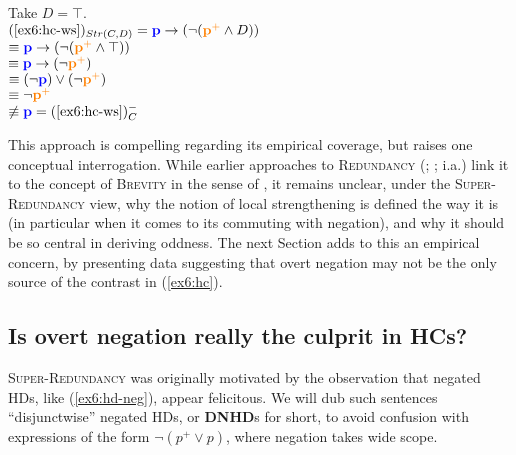 \begin{exe}
{		Take $D=\top$.\\
		$(\textref{ex6:hc-ws})_{Str(C, D)} =  \p \rightarrow (\neg(\pplus \wedge D)) $\\
		 $\equiv \textbf{\textcolor{blue}{p}} \rightarrow (\neg(\textbf{\textcolor{orange}{p$^+$}} \wedge \top))$\\
		 $\equiv \textbf{\textcolor{blue}{p}} \rightarrow (\neg\textbf{\textcolor{orange}{p$^+$}})$\\
		 $\equiv (\neg\textbf{\textcolor{blue}{p}}) \vee (\neg\textbf{\textcolor{orange}{p$^+$}})$\\
		 $\equiv \neg\textbf{\textcolor{orange}{p$^+$}}$\\
		 $\not\equiv \p = (\textref{ex6:hc-ws})^-_C$\\
		
	}
\end{exe}


This approach is compelling regarding its empirical coverage, but raises one conceptual interrogation. While earlier approaches to \textsc{Redundancy} (; ;  i.a.) link it to the concept of \textsc{Brevity} in the sense of \textcite{Grice1975}, it remains unclear, under the \textsc{Super-Redundancy} view, why the notion of local strengthening is defined the way it is (in particular when it comes to its commuting with negation), and why it should be so central in deriving oddness. The next Section adds to this an empirical concern, by presenting data suggesting that overt negation may not be the only source of the contrast in (\ref{ex6:hc}).



\subsection{Is overt negation really the culprit in HCs?}

\textsc{Super-Redundancy} was originally motivated by the observation that negated HDs, like (\ref{ex6:hd-neg}), appear felicitous. We will dub such sentences ``disjunctwise'' negated HDs, or \textbf{DNHD}s for short, to avoid confusion with expressions of the form $\neg (p^+ \vee p)$, where negation takes wide scope. 

\begin{exe}
	\label{ex6:hd-neg}
\end{exe}

